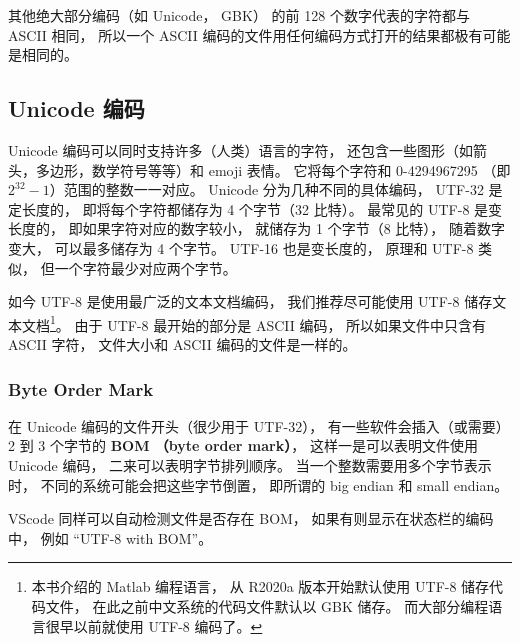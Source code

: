 其他绝大部分编码（如 Unicode， GBK） 的前 128 个数字代表的字符都与 ASCII 相同， 所以一个 ASCII 编码的文件用任何编码方式打开的结果都极有可能是相同的。

\subsection{Unicode 编码}
Unicode 编码可以同时支持许多（人类）语言的字符， 还包含一些图形（如箭头，多边形，数学符号等等）和 emoji 表情。 它将每个字符和 0-4294967295 （即 $2^{32}-1$）范围的整数一一对应。 Unicode 分为几种不同的具体编码， UTF-32 是定长度的， 即将每个字符都储存为 4 个字节（32 比特）。 最常见的 UTF-8 是变长度的， 即如果字符对应的数字较小， 就储存为 1 个字节（8 比特）， 随着数字变大， 可以最多储存为 4 个字节。 UTF-16 也是变长度的， 原理和 UTF-8 类似， 但一个字符最少对应两个字节。

如今 UTF-8 是使用最广泛的文本文档编码， 我们推荐尽可能使用 UTF-8 储存文本文档\footnote{本书介绍的 Matlab 编程语言， 从 R2020a 版本开始默认使用 UTF-8 储存代码文件， 在此之前中文系统的代码文件默认以 GBK 储存。 而大部分编程语言很早以前就使用 UTF-8 编码了。}。 由于 UTF-8 最开始的部分是 ASCII 编码， 所以如果文件中只含有 ASCII 字符， 文件大小和 ASCII 编码的文件是一样的。

\subsubsection{Byte Order Mark}
在 Unicode 编码的文件开头（很少用于 UTF-32）， 有一些软件会插入（或需要） 2 到 3 个字节的 \textbf{BOM （byte order mark）}， 这样一是可以表明文件使用 Unicode 编码， 二来可以表明字节排列顺序。 当一个整数需要用多个字节表示时， 不同的系统可能会把这些字节倒置， 即所谓的 big endian 和 small endian。

VScode 同样可以自动检测文件是否存在 BOM， 如果有则显示在状态栏的编码中， 例如 “UTF-8 with BOM”。
